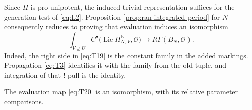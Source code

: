 Since $H$ is pro-unipotent, the induced trivial representation suffices
for the generation test of \eqref{eq:L2}.  Proposition
\ref{prop:ran-integrated-period} for $N$ consequently reduces to proving
that evaluation induces an isomorphism
\begin{equation}\label{eq:T20}
 \int_{V\supseteq U}
      C^\bullet\bigl(\operatorname{Lie}H_{N,V}^{\mathrm{lv}},
                    \mathcal O\bigr)
 \longrightarrow R\Gamma(B_N,\mathcal O).
\end{equation}
Indeed, the right side in \eqref{eq:T19} is the constant family in the
added markings.  Propagation \eqref{eq:T3} identifies it with the family
from the old tuple, and integration of that ! pull is the identity.

\begin{lemma}\label{lem:ran-unipotent-cohomology}
The evaluation map \eqref{eq:T20} is an isomorphism, with its relative
parameter comparisons.
\end{lemma}


